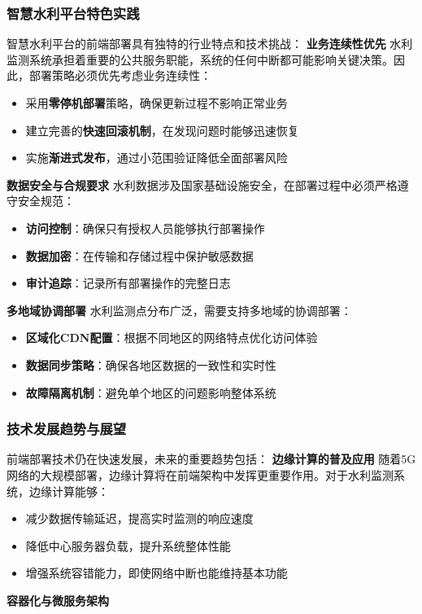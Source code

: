 \subsubsection{智慧水利平台特色实践}\label{ux667aux6167ux6c34ux5229ux5e73ux53f0ux7279ux8272ux5b9eux8df5}
智慧水利平台的前端部署具有独特的行业特点和技术挑战： \textbf{业务连续性优先} 水利监测系统承担着重要的公共服务职能，系统的任何中断都可能影响关键决策。因此，部署策略必须优先考虑业务连续性： \begin{itemize}
\tightlist \item 采用\textbf{零停机部署}策略，确保更新过程不影响正常业务 \item 建立完善的\textbf{快速回滚机制}，在发现问题时能够迅速恢复 \item
实施\textbf{渐进式发布}，通过小范围验证降低全面部署风险 \end{itemize} \textbf{数据安全与合规要求} 水利数据涉及国家基础设施安全，在部署过程中必须严格遵守安全规范： \begin{itemize}
\tightlist \item \textbf{访问控制}：确保只有授权人员能够执行部署操作 \item \textbf{数据加密}：在传输和存储过程中保护敏感数据 \item \textbf{审计追踪}：记录所有部署操作的完整日志
\end{itemize} \textbf{多地域协调部署} 水利监测点分布广泛，需要支持多地域的协调部署： \begin{itemize} \tightlist \item
\textbf{区域化CDN配置}：根据不同地区的网络特点优化访问体验 \item \textbf{数据同步策略}：确保各地区数据的一致性和实时性 \item \textbf{故障隔离机制}：避免单个地区的问题影响整体系统
\end{itemize} \subsubsection{技术发展趋势与展望}\label{ux6280ux672fux53d1ux5c55ux8d8bux52bfux4e0eux5c55ux671b}
前端部署技术仍在快速发展，未来的重要趋势包括： \textbf{边缘计算的普及应用} 随着5G网络的大规模部署，边缘计算将在前端架构中发挥更重要作用。对于水利监测系统，边缘计算能够： \begin{itemize} \tightlist
\item 减少数据传输延迟，提高实时监测的响应速度 \item 降低中心服务器负载，提升系统整体性能 \item 增强系统容错能力，即使网络中断也能维持基本功能 \end{itemize} \textbf{容器化与微服务架构}
